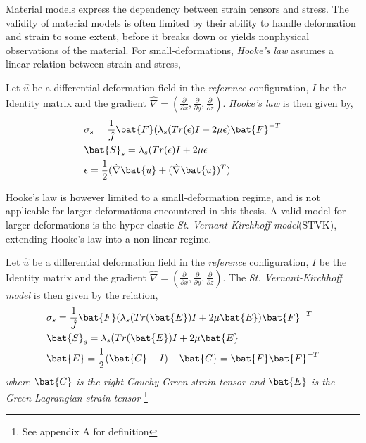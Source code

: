 Material models express the dependency between strain tensors and stress. The validity of material models is often limited by their ability to handle deformation and strain to some extent, before it breaks down or yields nonphysical observations of the material. For small-deformations,  \textit{Hooke's law} assumes a linear relation between strain and stress,

\begin{defn}
Let $\hat{u}$ be a differential deformation field in the \textit{reference} configuration, $I$ be the Identity matrix and the gradient $\hat{\nabla} = (\frac{\partial}{\partial x}, \frac{\partial}{\partial y}, \frac{\partial}{\partial z}) $. \textit{Hooke's law} is then given by,
\begin{align*}
&\sigma_s = \frac{1}{\hat{J}} \bat{F}(\lambda_s(Tr(\epsilon) I + 2 \mu  \epsilon)\bat{F}^{-T} \\
&\bat{S}_s = \lambda_s(Tr(\epsilon) I + 2 \mu \epsilon \\
&\epsilon = \frac{1}{2}(\hat{\nabla} \bat{u} + (\hat{\nabla} \bat{u})^T ) 
\end{align*} 
\end{defn}

Hooke's law is however limited to a small-deformation regime, and is not applicable for larger deformations encountered in this thesis. A valid model for larger deformations is the  hyper-elastic \textit{St. Vernant-Kirchhoff model}(STVK), 
extending Hooke's law into a non-linear regime.

 \begin{defn}
Let $\hat{u}$ be a differential deformation field in the \textit{reference} configuration, $I$ be the Identity matrix and the gradient $\hat{\nabla} = (\frac{\partial}{\partial x}, \frac{\partial}{\partial y}, \frac{\partial}{\partial z}) $. The \textit{St. Vernant-Kirchhoff model} is then given by the relation,
\begin{align*}
&\sigma_s = \frac{1}{\hat{J}} \bat{F}(\lambda_s(Tr(\bat{E}) I + 2 \mu \bat{E})\bat{F}^{-T} \\
&\bat{S}_s = \lambda_s(Tr(\bat{E}) I + 2 \mu \bat{E} \\
&\bat{E} = \frac{1}{2}(\bat{C} - I ) \hspace{4mm} \bat{C} = \bat{F}\bat{F}^{-T}
\end{align*} 
\textit{where $\bat{C}$ is the right Cauchy-Green strain tensor and $\bat{E}$ is the Green Lagrangian strain tensor} \footnote{See appendix A for definition}
\end{defn}
  

